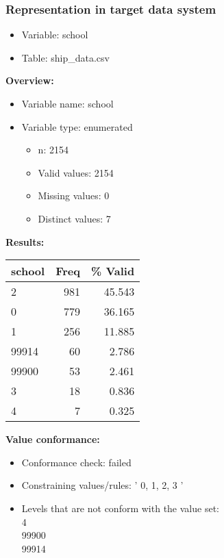 \documentclass[
]{article}
\providecommand{\tightlist}{%
  \setlength{\itemsep}{0pt}\setlength{\parskip}{0pt}}
\begin{document}
\newpage

\hypertarget{representation-in-target-data-system-23}{%
\subsubsection{\texorpdfstring{Representation in \textbf{target} data
system}{Representation in target data system}}\label{representation-in-target-data-system-23}}

\begin{itemize}
\tightlist
\item
  Variable: school
\item
  Table: ship\_data.csv
\end{itemize}

\textbf{Overview:}

\begin{itemize}
\tightlist
\item
  Variable name: school
\item
  Variable type: enumerated

  \begin{itemize}
  \tightlist
  \item
    n: 2154
  \item
    Valid values: 2154
  \item
    Missing values: 0
  \item
    Distinct values: 7
  \end{itemize}
\end{itemize}

\textbf{Results:}\\

\begin{table}[H]
\centering
\begin{tabular}{l|r|r}
\hline
\textbf{school} & \textbf{Freq} & \textbf{\% Valid}\\
\hline
2 & 981 & 45.543\\
\hline
0 & 779 & 36.165\\
\hline
1 & 256 & 11.885\\
\hline
99914 & 60 & 2.786\\
\hline
99900 & 53 & 2.461\\
\hline
3 & 18 & 0.836\\
\hline
4 & 7 & 0.325\\
\hline
\end{tabular}
\end{table}

\textbf{Value conformance:}

\begin{itemize}
\tightlist
\item
  Conformance check: failed
\item
  Constraining values/rules: ' 0, 1, 2, 3 '
\item
  Levels that are not conform with the value set:\\
  4\\
  99900\\
  99914
\end{itemize}
\end{document}
